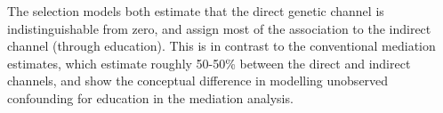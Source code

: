 The selection models both estimate that the direct genetic channel is indistinguishable from zero, and assign most of the association to the indirect channel (through education).
This is in contrast to the conventional mediation estimates, which estimate roughly 50-50\% between the direct and indirect channels, and show the conceptual difference in modelling unobserved confounding for education in the mediation analysis.



